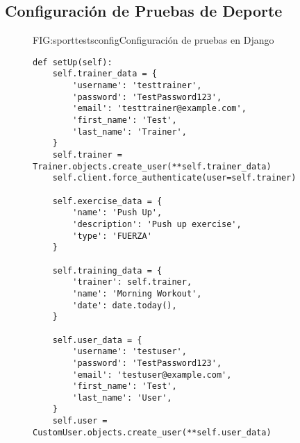 \subsection{Configuración de Pruebas de Deporte}
\begin{figure}[Configuración de Pruebas]{FIG:sporttestsconfig}{Configuración de pruebas en Django}
    \begin{verbatim}
def setUp(self):
    self.trainer_data = {
        'username': 'testtrainer',
        'password': 'TestPassword123',
        'email': 'testtrainer@example.com',
        'first_name': 'Test',
        'last_name': 'Trainer',
    }
    self.trainer = Trainer.objects.create_user(**self.trainer_data)
    self.client.force_authenticate(user=self.trainer)

    self.exercise_data = {
        'name': 'Push Up',
        'description': 'Push up exercise',
        'type': 'FUERZA'
    }

    self.training_data = {
        'trainer': self.trainer,
        'name': 'Morning Workout',
        'date': date.today(),
    }

    self.user_data = {
        'username': 'testuser',
        'password': 'TestPassword123',
        'email': 'testuser@example.com',
        'first_name': 'Test',
        'last_name': 'User',
    }
    self.user = CustomUser.objects.create_user(**self.user_data)
    \end{verbatim}
    \end{figure}

\newpage
